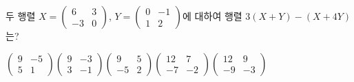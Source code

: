 \hspace*{2mm}\begin{minipage}[t]{\dimexpr\linewidth-2mm\relax}\vspace{0pt}
두 행렬 $X=\begin{pmatrix} 6 & 3 \\ -3 & 0 \end{pmatrix}$, $Y=\begin{pmatrix} 0 & -1 \\ 1 & 2 \end{pmatrix}$에 대하여 행렬 $3(X+Y)-(X+4Y)$는?
\begin{choicesii}{$\begin{pmatrix} 9 & -5 \\ 5 & 1 \end{pmatrix}$}{$\begin{pmatrix} 9 & -3 \\ 3 & -1 \end{pmatrix}$}{$\begin{pmatrix} 9 & 5 \\ -5 & 2 \end{pmatrix}$}{$\begin{pmatrix} 12 & 7 \\ -7 & -2 \end{pmatrix}$}{$\begin{pmatrix} 12 & 9 \\ -9 & -3 \end{pmatrix}$}\end{choicesii}\end{minipage}
